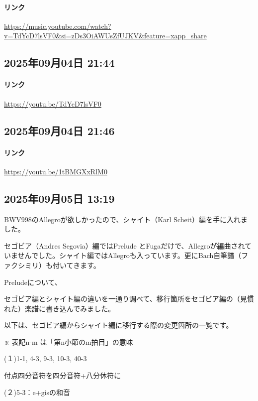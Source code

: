 \paragraph{リンク}
\url{https://music.youtube.com/watch?v=TdYcD7lsVF0&si=zDs3OiAWUsZfUJKV&feature=xapp_share}

\subsection*{2025年09月04日 21:44}

\paragraph{リンク}
\url{https://youtu.be/TdYcD7lsVF0}

\subsection*{2025年09月04日 21:46}

\paragraph{リンク}
\url{https://youtu.be/1tBMGXxRlM0}

\subsection*{2025年09月05日 13:19}

BWV998のAllegroが欲しかったので、シャイト（Karl Scheit）編を手に入れました。

セゴビア（Andres Segovia）編ではPrelude とFugaだけで、Allegroが編曲されていませんでした。シャイト編ではAllegroも入っています。更にBach自筆譜（ファクシミリ）も付いてきます。

Preludeについて、

セゴビア編とシャイト編の違いを一通り調べて、移行箇所をセゴビア編の（見慣れた）楽譜に書き込んでみました。

以下は、セゴビア編からシャイト編に移行する際の変更箇所の一覧です。

※ 表記n-m は「第n小節のm拍目」の意味

(１)1-1, 4-3, 9-3, 10-3, 40-3

付点四分音符を四分音符+八分休符に

(２)5-3：e+gisの和音

